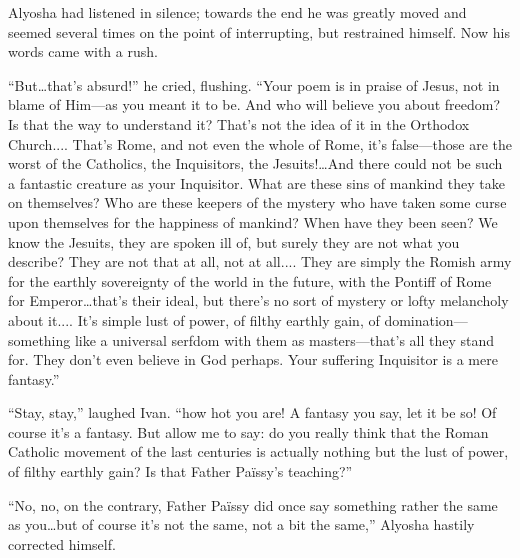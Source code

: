 
Alyosha had listened in silence; towards the end he was greatly moved
and \linebreak[4] seemed several times on the point of interrupting,
but restrained himself. Now his words came with a rush.

``But\ldots that's absurd!'' he cried, flushing. ``Your poem is in
praise of Jesus, not in blame of Him---as you meant it  to
be. And who will believe you about freedom? Is that the way to
understand it? That's not the idea of it in the Orthodox Church....
That's Rome, and not even the whole of Rome, it's false---those are
the worst of the Catholics, the Inquisitors, the Jesuits!\ldots And
there could not be such a fantastic creature as your Inquisitor. What
are these sins of mankind they take on themselves? Who are these
keepers of the mystery who have taken some curse upon themselves for
the happiness of mankind? When have they been seen? We know the
Jesuits, they are spoken ill of, but surely they are not what you
describe? They are not that at all, not at all.... They are simply the
Romish army for the earthly sovereignty of the world in the future,
with the Pontiff of Rome for Emperor\ldots that's their ideal, but
there's no sort of mystery or lofty melancholy about it.... It's
simple lust of power, of filthy earthly gain, of
dom\-i\-na\-tion---some\-thing like a universal serfdom with them as
mas\-ters---that's all they stand for. They don't even believe in God
perhaps. Your suffering Inquisitor is a mere fantasy.''

``Stay, stay,'' laughed Ivan. ``how hot you are! A fantasy you say,
let it be so! Of course it's a fantasy. But allow me to say: do you
really think that the Roman Catholic movement of the last centuries is
actually nothing but the lust of power, of filthy earthly gain? Is
that Father Pa\"{i}ssy's teaching?''

``No, no, on the contrary, Father Pa\"{i}ssy did once say something
rather the same as you\ldots but of course it's not the same, not a
bit the same,'' Alyosha hastily corrected himself.

